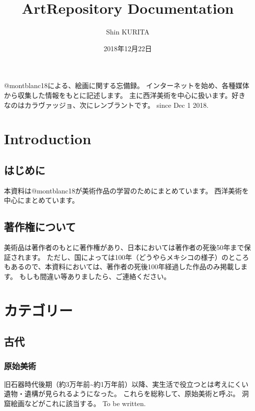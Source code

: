 \documentclass[letterpaper,10pt,dvipdfmx]{sphinxmanual}
\title{ArtRepository Documentation}
\date{2018年12月22日}
\author{Shin KURITA}
\begin{document}
\pagestyle{empty}
\maketitle
\pagestyle{plain}
\sphinxtableofcontents
\pagestyle{normal}
\label{\detokenize{index::doc}}


@montblanc18による、絵画に関する忘備録。
インターネットを始め、各種媒体から収集した情報をもとに記述します。
主に西洋美術を中心に扱います。好きなのはカラヴァッジョ、次にレンブラントです。
since Dec 1 2018.


\chapter{Introduction}
\label{\detokenize{introduction:introduction}}\label{\detokenize{introduction::doc}}

\section{はじめに}
\label{\detokenize{introduction:id1}}
本資料は@montblanc18が美術作品の学習のためにまとめています。
西洋美術を中心にまとめています。


\section{著作権について}
\label{\detokenize{introduction:id2}}
美術品は著作者のもとに著作権があり、日本においては著作者の死後50年まで保証されます。
ただし、国によっては100年（どうやらメキシコの様子）のところもあるので、本資料においては、著作者の死後100年経過した作品のみ掲載します。
もしも間違い等ありましたら、ご連絡ください。


\chapter{カテゴリー}
\label{\detokenize{category:id1}}\label{\detokenize{category::doc}}

\section{古代}
\label{\detokenize{category:id2}}

\subsection{原始美術}
\label{\detokenize{category:id3}}
旧石器時代後期（約3万年前\textasciitilde{}約1万年前）以降、実生活で役立つとは考えにくい遺物・遺構が見られるようになった。
これらを総称して、原始美術と呼ぶ。
洞窟絵画などがこれに該当する。
To be written.
\end{document}

